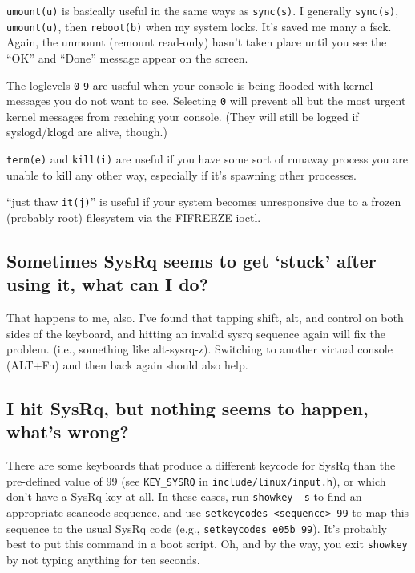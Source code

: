 \texttt{umount(u)} is basically useful in the same ways as
\texttt{sync(s)}. I generally \texttt{sync(s)}, \texttt{umount(u)}, then
\texttt{reboot(b)} when my system locks. It's saved me many a fsck.
Again, the unmount (remount read-only) hasn't taken place until you see
the ``OK'' and ``Done'' message appear on the screen.

The loglevels \texttt{0}-\texttt{9} are useful when your console is
being flooded with kernel messages you do not want to see. Selecting
\texttt{0} will prevent all but the most urgent kernel messages from
reaching your console. (They will still be logged if syslogd/klogd are
alive, though.)

\texttt{term(e)} and \texttt{kill(i)} are useful if you have some sort
of runaway process you are unable to kill any other way, especially if
it's spawning other processes.

``just thaw \texttt{it(j)}'' is useful if your system becomes
unresponsive due to a frozen (probably root) filesystem via the FIFREEZE
ioctl.

\subsection{\texorpdfstring{Sometimes SysRq seems to get `stuck' after
using it, what can I
do?}{Sometimes SysRq seems to get stuck after using it, what can I do?}}\label{sometimes-sysrq-seems-to-get-stuck-after-using-it-what-can-i-do}

That happens to me, also. I've found that tapping shift, alt, and
control on both sides of the keyboard, and hitting an invalid sysrq
sequence again will fix the problem. (i.e., something like alt-sysrq-z).
Switching to another virtual console (ALT+Fn) and then back again should
also help.

\subsection{I hit SysRq, but nothing seems to happen, what's
wrong?}\label{i-hit-sysrq-but-nothing-seems-to-happen-whats-wrong}

There are some keyboards that produce a different keycode for SysRq than
the pre-defined value of 99 (see \texttt{KEY\_SYSRQ} in
\texttt{include/linux/input.h}), or which don't have a SysRq key at all.
In these cases, run \texttt{showkey\ -s} to find an appropriate scancode
sequence, and use
\texttt{setkeycodes\ \textless{}sequence\textgreater{}\ 99} to map this
sequence to the usual SysRq code (e.g., \texttt{setkeycodes\ e05b\ 99}).
It's probably best to put this command in a boot script. Oh, and by the
way, you exit \texttt{showkey} by not typing anything for ten seconds.

